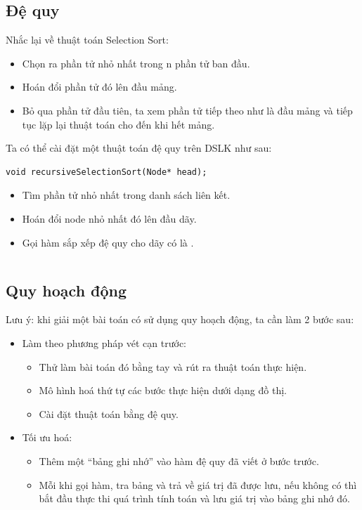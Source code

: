 \documentclass[main.tex]{subfiles}
\begin{document}
\subsection{Đệ quy}
Nhắc lại về thuật toán Selection Sort:
\begin{itemize}
	\item Chọn ra phần tử nhỏ nhất trong n phần tử ban đầu.
	\item Hoán đổi phần tử đó lên đầu mảng.
	\item Bỏ qua phần tử đầu tiên, ta xem phần tử tiếp theo như là đầu mảng và tiếp tục lặp lại thuật toán cho đến khi hết mảng.
\end{itemize}

Ta có thể cài đặt một thuật toán đệ quy trên DSLK như sau:

\begin{verbatim}
void recursiveSelectionSort(Node* head);
\end{verbatim}

\begin{itemize}
	\item Tìm phần tử nhỏ nhất trong danh sách liên kết.
	\item Hoán đổi node nhỏ nhất đó lên đầu dãy.
	\item Gọi hàm sắp xếp đệ quy cho dãy có  là .
\end{itemize}

\inputminted[linenos]{cpp}{answer_sources/DeQuy.cpp}

\subsection{Quy hoạch động}
Lưu ý: khi giải một bài toán có sử dụng quy hoạch động, ta cần làm 2 bước sau:
\begin{itemize}
	\item Làm theo phương pháp vét cạn trước:
		\begin{itemize}
			\item Thử làm bài toán đó bằng tay và rút ra thuật toán thực hiện.
			\item Mô hình hoá thứ tự các bước thực hiện dưới dạng đồ thị.
			\item Cài đặt thuật toán bằng đệ quy.
		\end{itemize}
	\item Tối ưu hoá:
		\begin{itemize}
			\item Thêm một ``bảng ghi nhớ'' vào hàm đệ quy đã viết ở bước trước.
			\item Mỗi khi gọi hàm, tra bảng và trả về giá trị đã được lưu, nếu không có thì bắt đầu thực thi quá trình tính toán và lưu giá trị vào bảng ghi nhớ đó.
		\end{itemize}
\end{itemize}
\end{document}
